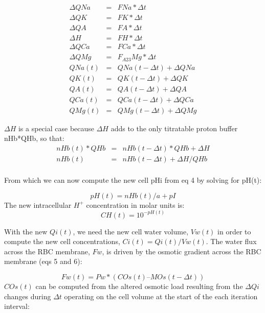 \documentclass[a4paper]{article}
\newcommand{\med}[1]{M#1}
\newcommand{\cell}[1]{C#1}
\newcommand{\MOs}{\med{Os}}
\newcommand{\COs}{\cell{Os}}
\newcommand{\F}[2]{F_{#1}#2}
\begin{document}
\begin{eqnarray}
\Delta QNa &=& FNa*\Delta t\\
\Delta QK &=& FK*\Delta t \\
\Delta QA &=& FA*\Delta t \\
\Delta H &=& FH*\Delta t \\
\Delta QCa &=& FCa*\Delta t \\
\Delta QMg &=& \F{A23}{Mg}*\Delta t \\
QNa(t) &=& QNa(t-\Delta t) + \Delta QNa \\
QK(t) &=& QK(t-\Delta t) + \Delta QK  \\
QA(t) &=& QA(t-\Delta t) + \Delta QA  \\
QCa(t) &=& QCa(t-\Delta t) + \Delta QCa  \\
QMg(t) &=& QMg(t-\Delta t) + \Delta QMg
\end{eqnarray}

$\Delta H$ is a special case because $\Delta H$ adds to the only titratable proton buffer nHb*QHb, so that:
\setcounter{equation}{0}
\renewcommand{\theequation}{21\alph{equation}}
\begin{eqnarray}
nHb(t)*QHb &=& nHb(t-\Delta t)*QHb + \Delta H \\
nHb(t) &=& nHb(t-\Delta t)  + \Delta H/QHb \\
\end{eqnarray}

From which we can now compute the new cell pHi from eq 4 by solving for pH(t):

\begin{equation}
pH(t) = nHb(t)/a + pI
\end{equation}
The new intracellular $H^+$ concentration in molar units is:
\begin{equation}
CH(t) = 10^{-pH(t)}
\end{equation}

With the new $Qi(t)$, we need the new cell water volume, $Vw(t)$ in order to compute the new cell concentrations, $Ci(t) = Qi(t)/Vw(t)$.  The water flux across the RBC membrane, $Fw$, is driven by the osmotic gradient across the RBC membrane (eqs 5 and 6): 
\setcounter{equation}{0}
\renewcommand{\theequation}{22\alph{equation}}

\begin{equation}
Fw(t) = Pw*(\COs(t) – \MOs(t-\Delta t)) 
\end{equation}
$\COs(t)$ can be computed from the altered osmotic load resulting from the $\Delta Qi$ changes during $\Delta t$ operating on the cell volume at the start of the each iteration interval: 
\end{document}
